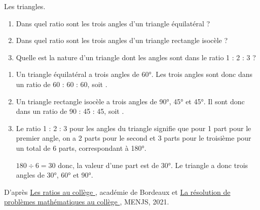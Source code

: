 \begin{Maquette}[Fiche,CorrigeFin,Colonnes=2]{}
\begin{multicols}{2}
      
      \begin{exercice} %
         Les triangles.
         \begin{enumerate}
            \item Dans quel ratio sont les trois angles d’un triangle équilatéral ?
            \item Dans quel ratio sont les trois angles d’un triangle rectangle isocèle ?
            \item Quelle est la nature d’un triangle dont les angles sont dans le ratio 1 : 2 : 3 ?
         \end{enumerate}
      \end{exercice}
      
      \begin{Solution}
         \begin{enumerate}
            \item Un triangle équilatéral a trois angles de \ang{60}. Les trois angles sont donc dans un ratio de 60 : 60 : 60, soit .
            \item Un triangle rectangle isocèle a trois angles de \ang{90}, \ang{45} et \ang{45}. Il sont donc dans un ratio de 90 : 45 : 45, soit .
            \item Le ratio 1 : 2 : 3 pour les angles du triangle signifie que pour 1 part pour le premier angle, on a 2 parts pour le second et 3 parts pour le troisième pour un total de 6 parts, correspondant à \ang{180}. \par
               $180\div6 =30$ donc, la valeur d'une part est de \ang{30}. Le triangle a donc trois angles de \ang{30}, \ang{60} et \ang{90}. \par
         \end{enumerate}
      \end{Solution}

   \end{multicols}
   \vfill\hfill{\footnotesize D'après \href{https://ent2d.ac-bordeaux.fr/disciplines/mathematiques/les-ratios-au-college/}{\og Les ratios au collège \fg}, académie de Bordeaux et \href{https://eduscol.education.fr/document/13132/download}{\og La résolution de problèmes mathématiques au collège \fg}, MENJS, 2021.}

\end{Maquette}


